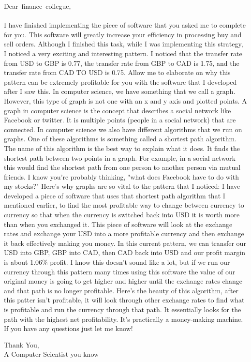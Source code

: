 \documentclass[12pt]{article}
\begin{document}
\newpage
\mbox{Dear finance collegue,}
\\ \\I have finished implementing the piece of software that you asked me to complete for you. This software will greatly increase your efficiency in processing buy and sell orders. Although I finished this task, while I was implementing this strategy, I noticed a very exciting and interesting pattern. I noticed that the transfer rate from USD to GBP is 0.77, the transfer rate from GBP to CAD is 1.75, and the transfer rate from CAD TO USD is 0.75. Allow me to elaborate on why this pattern can be extremely profitable for you with the software that I developed after I saw this. In computer science, we have something that we call a graph. However, this type of graph is not one with an x and y axis and plotted points. A graph in computer science is the concept that describes a social network like Facebook or twitter. It is multiple points (people in a social network) that are connected. In computer science we also have different algorithms that we run on graphs. One of these algorithms is something called a shortest path algorithm. The name of this algorithm is the best way to explain what it does. It finds the shortest path between two points in a graph. For example, in a social network this would find the shortest path from one person to another person via mutual friends. I know you're probably thinking, "what does Facebook have to do with my stocks?" Here’s why graphs are so vital to the pattern that I noticed: I have developed a piece of software that uses that shortest path algorithm that I mentioned earlier, to find the most profitable way to change between currency to currency so that when the currency is switched back into USD it is worth more than when you exchanged it. This piece of software will look at the exchange rates and exchange your USD into a more profitable currency and then exchange it back effectively making you money. In this current pattern, we can transfer our USD into GBP, GBP into CAD, then CAD back into USD and our profit margin is about 1.06\% profit. I know this doesn't sound like a lot, but if we run our currency through this pattern many times using this software the value of our original money is going to get higher and higher until the exchange rates change and that path is no longer profitable. Here's the beauty of this algorithm, after this patter isn't profitable, it will look through other exchange rates to find what is profitable and run the currency through that path. It essentially looks for the path with the highest net profitability. It's practically a money-making machine. If you have any questions just let me know!

Thank You,
\\A Computer Scientist you know  

\newpage
\pagebreak
\end{document}
